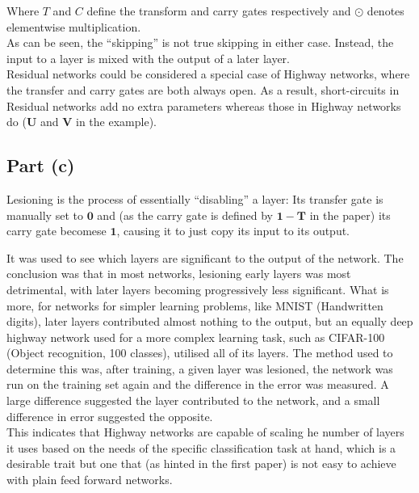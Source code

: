 Where $T$ and $C$ define the transform and carry gates respectively and $\odot$ denotes elementwise multiplication.\\[1em]

As can be seen, the ``skipping'' is not true skipping in either case. Instead, the input to a layer is mixed with the output of a later layer.\\[1em]

Residual networks could be considered a special case of Highway networks, where the transfer and carry gates are both always open. As a result, short-circuits in Residual networks add no extra parameters whereas those in Highway networks do ($\mathbf{U}$ and $\mathbf{V}$ in the example).\\[1em]

\subsection{Part (c)}

Lesioning is the process of essentially ``disabling'' a layer: Its transfer gate is manually set to $\mathbf{0}$ and (as the carry gate is defined by $\mathbf{1}-\mathbf{T}$ in the paper) its carry gate becomese $\mathbf{1}$, causing it to just copy its input to its output.

It was used to see which layers are significant to the output of the network. The conclusion was that in most networks, lesioning early layers was most detrimental, with later layers becoming progressively less significant. What is more, for networks for simpler learning problems, like MNIST (Handwritten digits), later layers contributed almost nothing to the output, but an equally deep highway network used for a more complex learning task, such as CIFAR-100 (Object recognition, 100 classes), utilised all of its layers. The method used to determine this was, after training, a given layer was lesioned, the network was run on the training set again and the difference in the error was measured. A large difference suggested the layer contributed to the network, and a small difference in error suggested the opposite.\\[1em]

This indicates that Highway networks are capable of scaling he number of layers it uses based on the needs of the specific classification task at hand, which is a desirable trait but one that (as hinted in the first paper) is not easy to achieve with plain feed forward networks.
